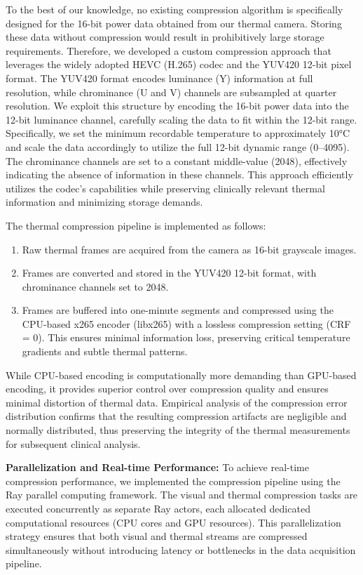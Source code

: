 To the best of our knowledge, no existing compression algorithm is specifically designed for the 16-bit power data obtained from our thermal camera. Storing these data without compression would result in prohibitively large storage requirements. Therefore, we developed a custom compression approach that leverages the widely adopted HEVC (H.265) codec and the YUV420 12-bit pixel format. The YUV420 format encodes luminance (Y) information at full resolution, while chrominance (U and V) channels are subsampled at quarter resolution. We exploit this structure by encoding the 16-bit power data into the 12-bit luminance channel, carefully scaling the data to fit within the 12-bit range. Specifically, we set the minimum recordable temperature to approximately 10°C and scale the data accordingly to utilize the full 12-bit dynamic range (0–4095). The chrominance channels are set to a constant middle-value (2048), effectively indicating the absence of information in these channels. This approach efficiently utilizes the codec's capabilities while preserving clinically relevant thermal information and minimizing storage demands.

The thermal compression pipeline is implemented as follows:

\begin{enumerate}
  \item Raw thermal frames are acquired from the camera as 16-bit grayscale images.
  \item Frames are converted and stored in the YUV420 12-bit format, with chrominance channels set to 2048.
  \item Frames are buffered into one-minute segments and compressed using the CPU-based x265 encoder (libx265) with a lossless compression setting (CRF = 0). This ensures minimal information loss, preserving critical temperature gradients and subtle thermal patterns.
\end{enumerate}

While CPU-based encoding is computationally more demanding than GPU-based encoding, it provides superior control over compression quality and ensures minimal distortion of thermal data. Empirical analysis of the compression error distribution confirms that the resulting compression artifacts are negligible and normally distributed, thus preserving the integrity of the thermal measurements for subsequent clinical analysis.

\vspace{1ex}
\noindent \textbf{Parallelization and Real-time Performance:} To achieve real-time compression performance, we implemented the compression pipeline using the Ray parallel computing framework. The visual and thermal compression tasks are executed concurrently as separate Ray actors, each allocated dedicated computational resources (CPU cores and GPU resources). This parallelization strategy ensures that both visual and thermal streams are compressed simultaneously without introducing latency or bottlenecks in the data acquisition pipeline.

